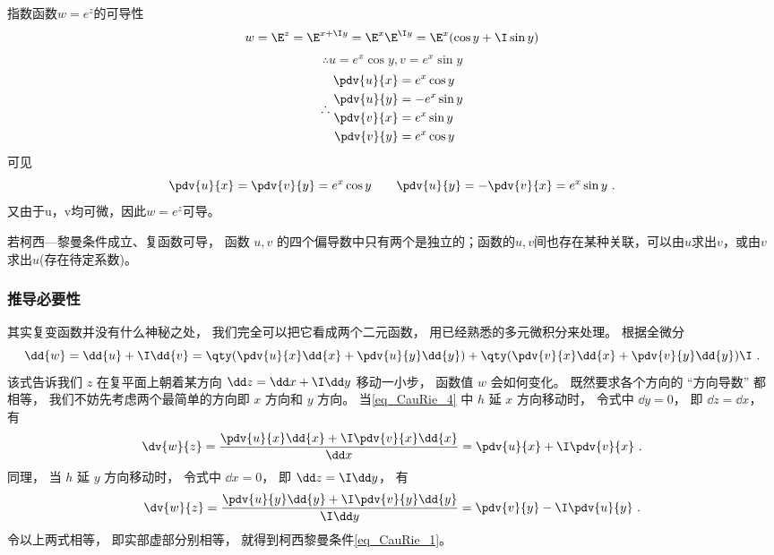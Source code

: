 \begin{example}{指数函数$w=e^z$的可导性}
$$w = \E^z = \E^{x + \I y} = \E^x \E^{\I y}=\E^x(\cos y + \I\sin y)$$
$$\therefore u=e^x\cos y, v = e^x\sin y$$
$$
\therefore
\begin{aligned}
\pdv{u}{x} &= e^x\cos y\\
\pdv{u}{y} &= -e^x\sin y\\
\pdv{v}{x} &= e^x\sin y\\
\pdv{v}{y} &= e^x\cos y\\
\end{aligned}
$$
可见
\begin{equation}
\pdv{u}{x} = \pdv{v}{y}= e^x\cos y \qquad
\pdv{u}{y} = - \pdv{v}{x}= e^x\sin y~.
\end{equation}
又由于u，v均可微，因此$w=e^z$可导。
\end{example}

若柯西—黎曼条件成立、复函数可导， 函数 $u,v$ 的四个偏导数中只有两个是独立的；函数的$u,v$间也存在某种关联，可以由$u$求出$v$，或由$v$求出$u$(存在待定系数)。

\subsubsection{推导必要性}
其实复变函数并没有什么神秘之处， 我们完全可以把它看成两个二元函数， 用已经熟悉的多元微积分来处理。 根据全微分
\begin{equation}\label{eq_CauRie_2}
\dd{w} = \dd{u} + \I \dd{v} = \qty(\pdv{u}{x} \dd{x} + \pdv{u}{y} \dd{y}) + \qty(\pdv{v}{x} \dd{x} + \pdv{v}{y} \dd{y})\I~.
\end{equation}
该式告诉我们 $z$ 在复平面上朝着某方向 $\dd z = \dd x + \I \dd y$ 移动一小步， 函数值 $w$ 会如何变化。 既然要求各个方向的 “方向导数” 都相等， 我们不妨先考虑两个最简单的方向即 $x$ 方向和 $y$ 方向。 当\autoref{eq_CauRie_4} 中 $h$ 延 $x$ 方向移动时， 令式中 $\dd y = 0$， 即 $\dd z = \dd x$， 有
\begin{equation}
\dv{w}{z} = \frac{\pdv{u}{x} \dd{x} +  \I\pdv{v}{x} \dd{x}}{\dd x} = \pdv{u}{x} +  \I\pdv{v}{x}~.
\end{equation}
同理， 当 $h$ 延 $y$ 方向移动时， 令式中 $\dd x = 0$， 即 $\dd z = \I\dd y$， 有
\begin{equation}
\dv{w}{z} = \frac{\pdv{u}{y} \dd{y} + \I\pdv{v}{y} \dd{y}}{\I \dd y} = \pdv{v}{y} -\I \pdv{u}{y}~.
\end{equation}
令以上两式相等， 即实部虚部分别相等， 就得到柯西黎曼条件\autoref{eq_CauRie_1}。

